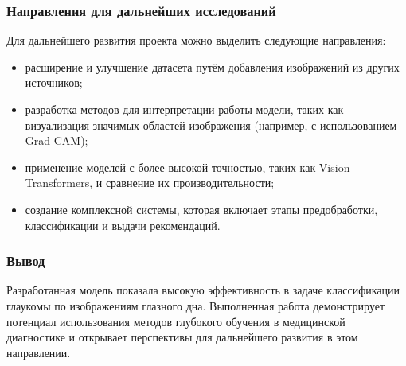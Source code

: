 {    \subsubsection*{Направления для дальнейших исследований}

    Для дальнейшего развития проекта можно выделить следующие направления:
    \begin{itemize}
        \item расширение и улучшение датасета путём добавления изображений из других источников;
        \item разработка методов для интерпретации работы модели, таких как визуализация значимых областей изображения (например, с использованием Grad-CAM);
        \item применение моделей с более высокой точностью, таких как Vision Transformers, и сравнение их производительности;
        \item создание комплексной системы, которая включает этапы предобработки, классификации и выдачи рекомендаций.
    \end{itemize}

    \subsubsection*{Вывод}

    Разработанная модель показала высокую эффективность в задаче классификации глаукомы по изображениям глазного дна. Выполненная работа демонстрирует потенциал использования методов глубокого обучения в медицинской диагностике и открывает перспективы для дальнейшего развития в этом направлении.

    \clearpage
}
